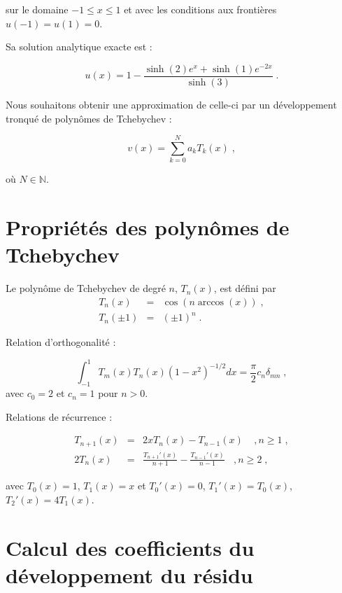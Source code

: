 \documentclass{report}
\begin{document}
sur le domaine $-1\leq x \leq 1$ et avec les conditions aux frontières $u(-1)=u(1)=0$.

Sa solution analytique exacte est :

\begin{equation}
u(x) = 1- \frac{\sinh(2)e^{x}+\sinh(1)e^{-2x}}{\sinh(3)}\;.
\end{equation}

Nous souhaitons obtenir une approximation de celle-ci par un développement tronqué de polynômes de Tchebychev :

\begin{equation}\label{eq:app}
v(x) = \sum_{k=0}^N a_k T_k(x) \;,
\end{equation}

où $N \in \mathbb{N}$.

\section{Propriétés des polynômes de Tchebychev}

Le polynôme de Tchebychev de degré $n$, $T_n(x)$, est défini par
\begin{eqnarray}
T_n(x) &=& \cos (n\arccos(x))\;, \label{T_def}\\
T_n(\pm1) &=& (\pm1)^n\;.\label{eq+-1}
\end{eqnarray}

Relation d'orthogonalité :

\begin{equation}\label{ortho}
\int_{-1}^{1} T_m(x) T_n(x) (1-x^2)^{-1/2} dx = \frac{\pi}{2} c_n \delta_{mn}\;,
\end{equation}
avec $c_0=2$ et $c_n = 1$ pour $n>0$.

Relations de récurrence :

\begin{eqnarray}
T_{n+1}(x) & = & 2xT_n(x) - T_{n-1}(x) \ \ \ \ \ , n \geq 1\;,\\
2T_n (x) & = & \frac{T_{n+1}'(x)}{n+1} - \frac{T_{n-1}'(x)}{n-1} \ \ \ \ , n \geq 2\;,\label{eq:rec}
\end{eqnarray}

avec $T_0 (x) = 1$, $T_1 (x) = x$ et $T_0' (x) = 0$, $T_1' (x) = T_0 (x)$, $T_2' (x) = 4T_1 (x)$.

\section{Calcul des coefficients du développement du résidu}
\end{document}
